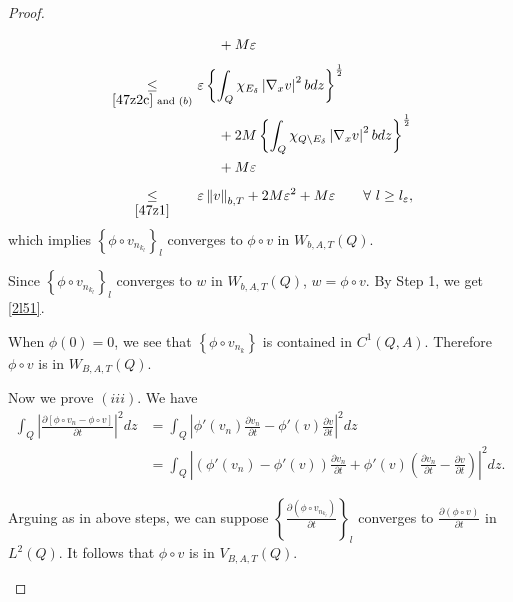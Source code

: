 \documentclass[11pt, a4paper]{article}
\numberwithin{equation}{section}
\newcommand{\coex}[2][\hphantom{longexplanation}]{%
  \underset{{#1}}{\overset{\hphantom{longexplanation}}{#2}}
}
\newcommand{\abs}[1]{\left\lvert #1\right\rvert}
\newcommand{\norm}[1]{\left\lVert #1\right\rVert}
\begin{document}
\begin{proof}
\begin{description}[wide]
\begin{align*}
  &\coex{~} \qquad + M\varepsilon\\
  &\coex[\eqref{47z2c} \text{ and } (b)]{\le} \varepsilon \left\{\int_Q  \chi_{E_{\delta}} \abs{\nabla_x v}^2bdz\right\}^{\frac{1}{2}}\\
  &\coex{~} \qquad+ 2M \left\{\int_Q 
    \chi_{Q\setminus E_{\delta}}\abs{\nabla_x v}^2bdz\right\}^{\frac{1}{2}}\\
  &\coex{~} \qquad + M\varepsilon\\
&\coex[\eqref{47z1}]{\le}
  \varepsilon\norm{v}_{b,T}+2M\varepsilon^{2}+M\varepsilon\qquad\forall~l \ge l_{\varepsilon},
\end{align*}
which implies $\left\{\phi\circ v_{n_{k_{l}}}\right\}_{l}$ converges
to $\phi\circ v$ in $W_{b,A,T}(Q)$.

 Since $\left\{\phi \circ v_{n_{k_{l}}}\right\}_{l}$ converges to $w$
 in $W_{b,A,T}(Q)$, $w= \phi\circ v$. By Step 1, we get \eqref{2l51}.
\item[Step 3.] When  $\phi(0)=0
 $,  we see that $\left\{\phi\circ v_{n_{k}}\right\}$ is contained in
 $C^{1}(Q,A)$. Therefore $\phi\circ v$ is in $W_{B,A,T}(Q)$.
\item[Step 4.] Now we  prove $(iii)$. We have 
\begin{align*}
\int_{Q}\abs{\frac{\partial \left[\phi\circ v_{n}- \phi\circ v \right]}{\partial
  t}}^{2}dz
  &= \int_{Q}\abs{\phi'(v_{n})\frac{\partial v_{n}}{\partial
    t}- \phi'(v)\frac{\partial v}{\partial t}}^{2}dz\\
  &= \int_{Q}\abs{\left(\phi'(v_{n})-\phi'(v) \right)\frac{\partial v_{n}}{\partial t}+
  \phi'(v) \left(\frac{\partial v_{n}}{\partial t}-\frac{\partial v}{\partial
    t} \right)}^{2}dz.
\end{align*}

Arguing as in above steps, we can suppose
$\left\{\displaystyle\frac{\partial\left(\phi\circ v_{n_{k_l}}
    \right)}{\partial t}\right\}_{l}$ converges to
$\displaystyle\frac{\partial (\phi\circ v)}{\partial
  t} $ in $L^{2}(Q)$. It follows that $\phi\circ v$ is in
$V_{B,A,T}(Q)$.
\end{description}
\end{proof}
\end{document}
